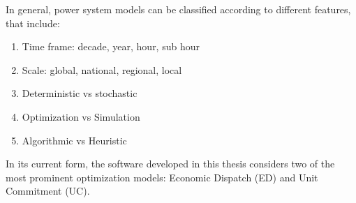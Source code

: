 \documentclass[12pt,LUDisStyle,twosided]{book}
\begin{document}
In general, power system models can be classified according to different features, that include:

\begin{enumerate}
\item Time frame: decade, year, hour, sub hour 
\item Scale: global, national, regional, local
\item Deterministic vs stochastic
\item Optimization vs Simulation
\item Algorithmic vs Heuristic
\end{enumerate}

In its current form, the software developed in this thesis considers two of the most prominent optimization models: Economic Dispatch (ED) and Unit Commitment (UC). 
\end{document}
